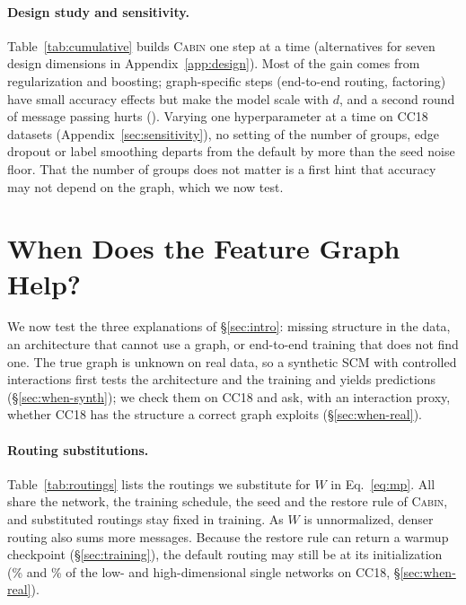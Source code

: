 \documentclass[anon,12pt]{clear2027} %
\newcommand{\Cabin}{\textsc{Cabin}}
\begin{document}
\paragraph{Design study and sensitivity.}
Table~\ref{tab:cumulative} builds \Cabin{} one step at a time (alternatives for seven design dimensions in Appendix~\ref{app:design}). Most of the gain comes from regularization and boosting; graph-specific steps (end-to-end routing, factoring) have small accuracy effects but make the model scale with $d$, and a second round of message passing hurts (\DFourKtwo{}). Varying one hyperparameter at a time on \SensTasks{} CC18 datasets (Appendix~\ref{sec:sensitivity}), no setting of the number of groups, edge dropout or label smoothing departs from the default by more than the seed noise floor. That the number of groups does not matter is a first hint that accuracy may not depend on the graph, which we now test.

\section{When Does the Feature Graph Help?}
\label{sec:when}

We now test the three explanations of \S\ref{sec:intro}: missing structure in the data, an architecture that cannot use a graph, or end-to-end training that does not find one. The true graph is unknown on real data, so a synthetic SCM with controlled interactions first tests the architecture and the training and yields predictions (\S\ref{sec:when-synth}); we check them on CC18 and ask, with an interaction proxy, whether CC18 has the structure a correct graph exploits (\S\ref{sec:when-real}).

\paragraph{Routing substitutions.}
\label{sec:substitutions}
Table~\ref{tab:routings} lists the routings we substitute for $W$ in Eq.~\eqref{eq:mp}. All share the network, the training schedule, the seed and the restore rule of \Cabin{}, and substituted routings stay fixed in training. As $W$ is unnormalized, denser routing also sums more messages. Because the restore rule can return a warmup checkpoint (\S\ref{sec:training}), the default routing may still be at its initialization (\LowSingleWarmupRestore{}\% and \HighSingleWarmupRestore{}\% of the low- and high-dimensional single networks on CC18, \S\ref{sec:when-real}).
\end{document}
